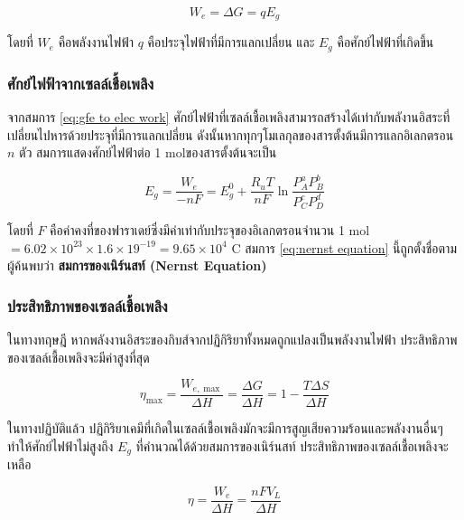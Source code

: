 \documentclass[11pt]{article}
\begin{document}
\begin{equation}
  \label{eq:gfe to elec work}
  W_e= \Delta G = q E_g 
\end{equation}

โดยที่ \(W_e\) คือพลังงานไฟฟ้า \(q\) คือประจุไฟฟ้าที่มีการแลกเปลี่ยน และ \(E_g\) คือศักย์ไฟฟ้าที่เกิดขึ้น

\subsubsection{ศักย์ไฟฟ้าจากเซลล์เชื้อเพลิง}
\label{sec:org67981d6}

จากสมการ \ref{eq:gfe to elec work} ศักย์ไฟฟ้าที่เซลล์เชื้อเพลิงสามารถสร้างได้เท่ากับพลังานอิสระที่เปลี่ยนไปหารด้วยประจุที่มีการแลกเปลี่ยน ดังนั้นหากทุกๆโมเลกุลของสารตั้งต้นมีการแลกอิเลกตรอน \(n\) ตัว สมการแสดงศักย์ไฟฟ้าต่อ 1 molของสารตั้งต้นจะเป็น

\begin{equation}
  \label{eq:nernst equation}
  E_g = \frac{W_e}{-nF} = E_g^0 + \frac{R_u T}{nF} \ln \frac{P_A^a P_B^b}{P_C^c P_D^d}
\end{equation}

โดยที่ \(F\) คือค่าคงที่ของฟาราเดย์ซึ่งมีค่าเท่ากับประจุของอิเลกตรอนจำนวน 1 mol \(= 6.02 \times 10^{23} \times 1.6 \times 19^{-19} = 9.65 \times 10^4 \text{ C}\) สมการ \ref{eq:nernst equation} นี้ถูกตั้งชื่อตามผู้ค้นพบว่า \textbf{สมการของเนิร์นสท์ (Nernst Equation)}

\subsubsection{ประสิทธิภาพของเซลล์เชื้อเพลิง}
\label{sec:org96f667f}

ในทางทฤษฎี หากพลังงานอิสระของกิบส์จากปฏิกิริยาทั้งหมดถูกแปลงเป็นพลังงานไฟฟ้า ประสิทธิภาพของเซลล์เชื้อเพลิงจะมีค่าสูงที่สุด

\begin{equation}
  \label{eq:fc max eff}
  \eta_{\max} = \frac{W_{e,\max}}{\Delta H} = \frac{\Delta G}{\Delta H} = 1 - \frac{T \Delta S}{\Delta H}
\end{equation}

ในทางปฏิบัติแล้ว ปฏิกิริยาเคมีที่เกิดในเซลล์เชื้อเพลิงมักจะมีการสูญเสียความร้อนและพลังงานอื่นๆ ทำให้ศักย์ไฟฟ้าไม่สูงถึง \(E_g\) ที่คำนวณได้ด้วยสมการของเนิร์นสท์ ประสิทธิภาพของเซลล์เชื้อเพลิงจะเหลือ

\begin{equation}
  \label{eq:fc act eff}
  \eta = \frac{W_e}{\Delta H} = \frac{nFV_L}{\Delta H}
\end{equation}
\end{document}
